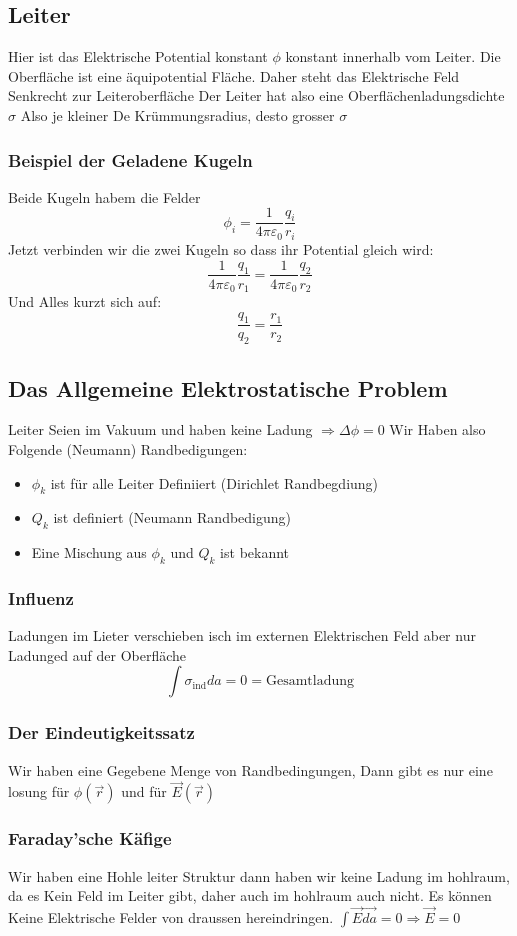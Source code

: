\documentclass{article}
\begin{document}
\subsection{Leiter}Hier ist das Elektrische Potential konstant $\phi$ konstant innerhalb vom Leiter. Die Oberfläche ist eine äquipotential Fläche. Daher steht das Elektrische Feld Senkrecht zur Leiteroberfläche
Der Leiter hat also eine Oberflächenladungsdichte $\sigma$ Also je kleiner De Krümmungsradius, desto grosser $\sigma$
\subsubsection{Beispiel der Geladene Kugeln} Beide Kugeln habem die Felder \[\phi_i=\frac{1}{4\pi\varepsilon_0}\frac{q_i}{r_i}\] Jetzt verbinden wir die zwei Kugeln so dass ihr Potential gleich wird:
\[\frac{1}{4\pi\varepsilon_0}\frac{q_1}{r_1}=\frac{1}{4\pi\varepsilon_0}\frac{q_2}{r_2}\]Und Alles kurzt sich auf:\[\frac{q_1}{q_2}=\frac{r_1}{r_2}\]
\subsection{Das Allgemeine Elektrostatische Problem} Leiter Seien im Vakuum und haben keine Ladung $\Rightarrow \Delta\phi=0$ Wir Haben also Folgende (Neumann) Randbedigungen:\begin{itemize}
  \item{$\phi_k$ ist für alle Leiter Definiiert (Dirichlet Randbegdiung)}
  \item{$Q_k$ ist definiert (Neumann Randbedigung)}
  \item{Eine Mischung aus $\phi_k$ und $Q_k$ ist bekannt}
\end{itemize}
\subsubsection{Influenz} Ladungen im Lieter verschieben isch im externen Elektrischen Feld aber nur Ladunged auf der Oberfläche \[\int \sigma_\text{ind} da=0=\text{Gesamtladung}\]
\subsubsection{Der Eindeutigkeitssatz} Wir haben eine Gegebene Menge von Randbedingungen, Dann gibt es nur eine losung für $\phi(\vec{r})$ und für $\vec{E}(\vec{r})$
\subsubsection{Faraday'sche Käfige} Wir haben eine Hohle leiter Struktur dann haben wir keine Ladung im hohlraum, da es Kein Feld im Leiter gibt, daher auch im hohlraum auch nicht. Es können Keine Elektrische Felder von draussen hereindringen.
$\int \vec{E}\vec{da}=0\Rightarrow \vec{E}=0$
\end{document}
